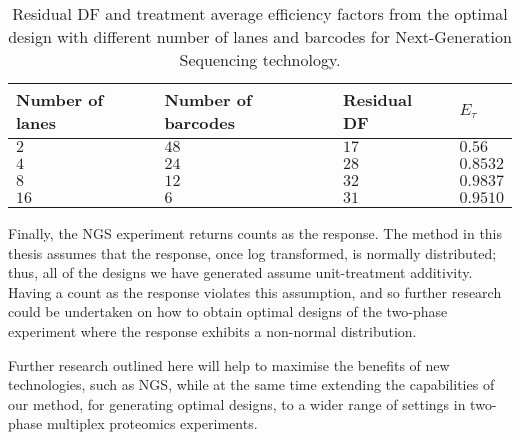 \begin{table}[!h]
\centering
\caption{Residual DF and treatment average efficiency factors from the optimal design with different number of lanes and barcodes for Next-Generation Sequencing technology.}
\begin{tabular}{|l|l|l|l|}
\hline 
Number of lanes	& Number of barcodes & Residual DF & $E_\tau$  \\ 
\hline 
$2$ 	& $48$ & $17$ & $0.56$ \\ 
\hline 
$4$ 	& $24$ & $28$ & $0.8532$  \\ 
\hline 
$8$ & $12$ & $32$ & $0.9837$  \\ 
\hline 
$16$ & $6$ & $31$ & $0.9510$  \\ 
\hline 
\end{tabular} 
\label{tab:NGS}
\end{table}
 
Finally, the NGS experiment returns counts as the response. The method in this thesis assumes that the response, once log transformed, is normally distributed; thus, all of the designs we have generated assume unit-treatment additivity. Having a count as the response violates this assumption, and so further research could be undertaken on how to obtain optimal designs of the two-phase experiment where the response exhibits a non-normal distribution.

Further research outlined here will help to maximise the benefits of new technologies, such as NGS, while at the same time extending the capabilities of our method, for generating optimal designs, to a wider range of settings in two-phase multiplex proteomics experiments. 


